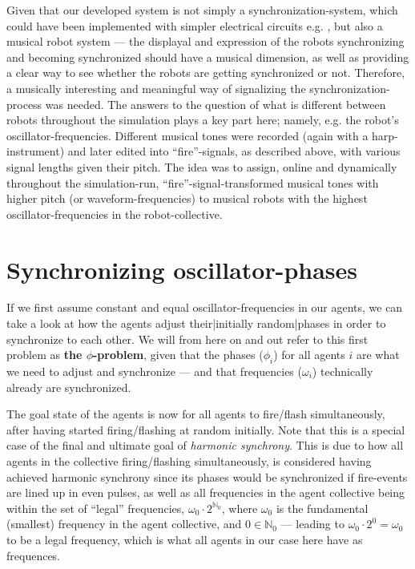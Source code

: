 				
			
			Given that our developed system is not simply a synchronization-system, which could have been implemented with simpler electrical circuits e.g. \cite{}, but also a musical robot system — the displayal and expression of the robots synchronizing and becoming synchronized should have a musical dimension, as well as providing a clear way to see whether the robots are getting synchronized or not. Therefore, a musically interesting and meaningful way of signalizing the synchronization-process was needed. The answers to the question of what is different between robots throughout the simulation plays a key part here; namely, e.g. the robot's oscillator-frequencies. 
			Different musical tones were recorded (again with a harp-instrument) and later edited into ``fire''-signals, as described above, with various signal lengths given their pitch.
			The idea was to assign, online and dynamically throughout the simulation-run, ``fire''-signal-transformed musical tones with higher pitch (or waveform-frequencies) to musical robots with the highest oscillator-frequencies in the robot-collective.




\section{Synchronizing oscillator-phases}
\label{sec:phase_methods}
	If we first assume constant and equal oscillator-frequencies in our agents, we can take a look at how the agents adjust their|initially random|phases in order to synchronize to each other. We will from here on and out refer to this first problem as \textbf{the $\phi$-problem}, given that the phases ($\phi_i$) for all agents $i$ are what we need to adjust and synchronize — and that frequencies ($\omega_i$) technically already are synchronized.
	
	The goal state of the agents is now for all agents to fire/flash simultaneously, after having started firing/flashing at random initially. Note that this is a special case of the final and ultimate goal of \textit{harmonic synchrony}. This is due to how all agents in the collective firing/flashing simultaneously, is considered having achieved harmonic synchrony since its phases would be synchronized if fire-events are lined up in even pulses, as well as all frequencies in the agent collective being within the set of ``legal'' frequencies, $\omega_{0} \cdot 2^{\mathbb{N}_0}$, where $\omega_0$ is the fundamental (smallest) frequency in the agent collective, and $0 \in \mathbb{N}_0$ — leading to $\omega_0 \cdot 2^0 = \omega_0$ to be a legal frequency, which is what all agents in our case here have as frequences.
	
